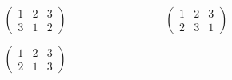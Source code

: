 \begin{frame}
\begin{columns}
\begin{column}{0.33\textwidth}
        \end{column}
        \begin{column}{0.33\textwidth}
            \begin{equation*}
                \left(\begin{array}{ccc}
                    1 & 2 & 3 \\
                    3 & 1 & 2 
                \end{array}\right)
            \end{equation*}
            \vspace{-0.5cm}
            \begin{figure}[H]
                \begin{centering}
                    
                \end{centering}
            \end{figure}
            \vspace{-0.2cm}
            \begin{equation*}
                \left(\begin{array}{ccc}
                    1 & 2 & 3 \\
                    2 & 1 & 3
                \end{array}\right)
            \end{equation*}
            \vspace{-0.5cm}
            \begin{figure}[H]
                \begin{centering}
                    
                \end{centering}
            \end{figure}
        \end{column}
        \begin{column}{0.33\textwidth}
            \begin{equation*}
                \left(\begin{array}{ccc}
                    1 & 2 & 3 \\
                    2 & 3 & 1 
                \end{array}\right)
            \end{equation*}
            \vspace{-0.5cm}
            \begin{figure}[H]
                \begin{centering}
                    
                \end{centering}

\end{figure}
\end{column}
\end{columns}
\end{frame}
